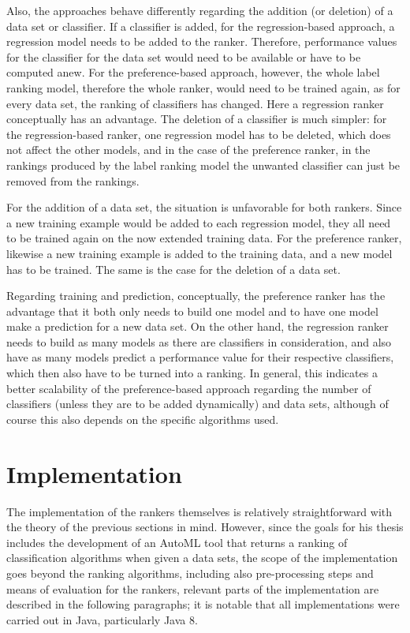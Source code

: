 Also, the approaches behave differently regarding the addition (or deletion) of a data set or classifier. If a classifier is added, for the regression-based approach, a regression model needs to be added to the ranker. Therefore, performance values for the classifier for the data set would need to be available or have to be computed anew. For the preference-based approach, however, the whole label ranking model, therefore the whole ranker, would need to be trained again, as for every data set, the ranking of classifiers has changed. Here a regression ranker conceptually has an advantage. The deletion of a classifier is much simpler: for the regression-based ranker, one regression model has to be deleted, which does not affect the other models, and in the case of the preference ranker, in the rankings produced by the label ranking model the unwanted classifier can just be removed from the rankings.

For the addition of a data set, the situation is unfavorable for both rankers. Since a new training example would be added to each regression model, they all need to be trained again on the now extended training data. For the preference ranker, likewise a new training example is added to the training data, and a new model has to be trained. The same is the case for the deletion of a data set.

Regarding training and prediction, conceptually, the preference ranker has the advantage that it both only needs to build one model and to have one model make a prediction for a new data set. On the other hand, the regression ranker needs to build as many models as there are classifiers in consideration, and also have as many models predict a performance value for their respective classifiers, which then also have to be turned into a ranking. In general, this indicates a better scalability of the preference-based approach regarding the number of classifiers (unless they are to be added dynamically) and data sets, although of course this also depends on the specific algorithms used. 

\section{Implementation}

The implementation of the rankers themselves is relatively straightforward with the theory of the previous sections in mind. However, since the goals for his thesis includes the development of an AutoML tool that returns a ranking of classification algorithms when given a data sets, the scope of the implementation goes beyond the ranking algorithms, including also pre-processing steps and means of evaluation for the rankers, relevant parts of the implementation are described in the following paragraphs; it is notable that all implementations were carried out in Java, particularly Java 8.

